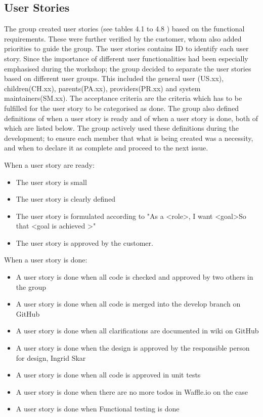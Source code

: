 \subsection{User Stories}
\label{User stories}
The group created user stories (see tables 4.1 to 4.8 ) based on the functional requirements. These were further verified by the customer, whom also added priorities to guide the group. The user stories contains ID to identify each user story. Since the importance of different user functionalities had been especially emphasised during the workshop; the group decided to separate the user stories based on different user groups. This included the general user (US.xx), children(CH.xx), parents(PA.xx), providers(PR.xx) and system maintainers(SM.xx). The acceptance criteria are the criteria which has to be fulfilled for the user story to be categorised as done. The group also defined definitions of when a user story is ready and of when a user story is done, both of which are listed below. The group actively used these definitions during the development; to ensure each member that what is being created was a necessity, and when to declare it as complete and proceed to the next issue.  

\begin{description}
    \item[When a user story are ready:]
\end{description}
\begin{itemize}[noitemsep]
    \item The user story is small
    \item The user story is clearly defined
    \item The user story is formulated according to "As a \textless role\textgreater, I want \textless goal\textgreater So that \textless goal is achieved \textgreater"
    \item The user story is approved by the customer.
\end{itemize}

\begin{description}
    \item[When a user story is done:]
\end{description}
\begin{itemize}[noitemsep]
    \item A user story is done when all code is checked and approved by two others in the group
    \item A user story is done when all code is merged into the develop branch on GitHub
    \item A user story is done when all clarifications are documented in wiki on GitHub
    \item A user story is done when the design is approved by the responsible person for design, Ingrid Skar 
    \item A user story is done when all code is approved in unit tests
    \item A user story is done when there are no more todos in Waffle.io on the case
    \item A user story is done when Functional testing is done
\end{itemize}

